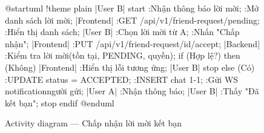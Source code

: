 \documentclass[12pt,a4paper]{report}
\begin{document}
\renewcommand{\arraystretch}{1}

\begin{figure}[H]
    \centering
    \begin{plantuml}
        @startuml
        !theme plain
        |User B|
        start
        :Nhận thông báo lời mời;
        :Mở danh sách lời mời;
        |Frontend|
        :GET /api/v1/friend-request/pending;
        :Hiển thị danh sách;
        |User B|
        :Chọn lời mời từ A;
        :Nhấn "Chấp nhận";
        |Frontend|
        :PUT /api/v1/friend-request/{id}/accept;
        |Backend|
        :Kiểm tra lời mời\n(tồn tại, PENDING, quyền);
        if (Hợp lệ?) then (Không)
          |Frontend|
          :Hiển thị lỗi tương ứng;
          |User B|
          stop
        else (Có)
          :UPDATE status = ACCEPTED;
          :INSERT chat 1-1;
          :Gửi WS notification người gửi;
          |User A|
          :Nhận thông báo;
          |User B|
          :Thấy "Đã kết bạn";
          stop
        endif
        @enduml
    \end{plantuml}
    \caption{Activity diagram --- Chấp nhận lời mời kết bạn}
\end{figure}
\end{document}
